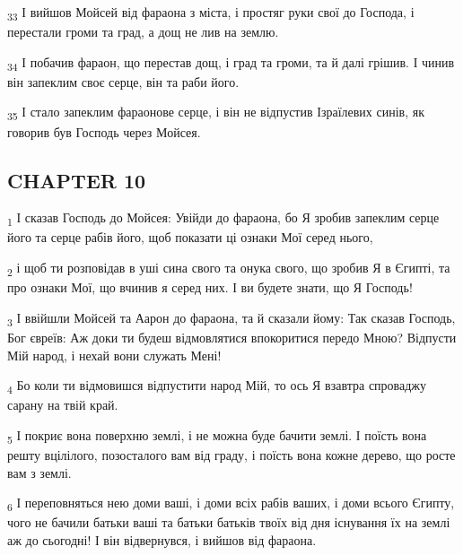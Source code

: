 \begin{tcolorbox}
\textsubscript{33} І вийшов Мойсей від фараона з міста, і простяг руки свої до Господа, і перестали громи та град, а дощ не лив на землю.
\end{tcolorbox}
\begin{tcolorbox}
\textsubscript{34} І побачив фараон, що перестав дощ, і град та громи, та й далі грішив. І чинив він запеклим своє серце, він та раби його.
\end{tcolorbox}
\begin{tcolorbox}
\textsubscript{35} І стало запеклим фараонове серце, і він не відпустив Ізраїлевих синів, як говорив був Господь через Мойсея.
\end{tcolorbox}
\subsection{CHAPTER 10}
\begin{tcolorbox}
\textsubscript{1} І сказав Господь до Мойсея: Увійди до фараона, бо Я зробив запеклим серце його та серце рабів його, щоб показати ці ознаки Мої серед нього,
\end{tcolorbox}
\begin{tcolorbox}
\textsubscript{2} і щоб ти розповідав в уші сина свого та онука свого, що зробив Я в Єгипті, та про ознаки Мої, що вчинив я серед них. І ви будете знати, що Я Господь!
\end{tcolorbox}
\begin{tcolorbox}
\textsubscript{3} І ввійшли Мойсей та Аарон до фараона, та й сказали йому: Так сказав Господь, Бог євреїв: Аж доки ти будеш відмовлятися впокоритися передо Мною? Відпусти Мій народ, і нехай вони служать Мені!
\end{tcolorbox}
\begin{tcolorbox}
\textsubscript{4} Бо коли ти відмовишся відпустити народ Мій, то ось Я взавтра спроваджу сарану на твій край.
\end{tcolorbox}
\begin{tcolorbox}
\textsubscript{5} І покриє вона поверхню землі, і не можна буде бачити землі. І поїсть вона решту вцілілого, позосталого вам від граду, і поїсть вона кожне дерево, що росте вам з землі.
\end{tcolorbox}
\begin{tcolorbox}
\textsubscript{6} І переповняться нею доми ваші, і доми всіх рабів ваших, і доми всього Єгипту, чого не бачили батьки ваші та батьки батьків твоїх від дня існування їх на землі аж до сьогодні! І він відвернувся, і вийшов від фараона.
\end{tcolorbox}
